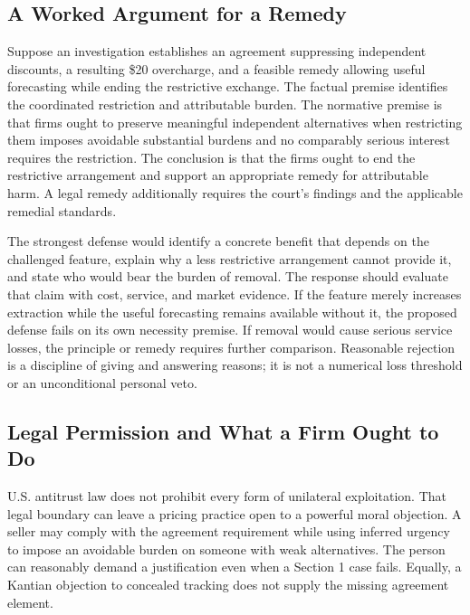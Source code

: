 \hypertarget{M09-a-worked-argument-for-a-remedy}{%
\subsection{A Worked Argument for a
Remedy}\label{M09-a-worked-argument-for-a-remedy}}

\noindent \noindent Suppose an investigation establishes an agreement suppressing
independent discounts, a resulting \$20 overcharge, and a feasible
remedy allowing useful forecasting while ending the restrictive
exchange. The factual premise identifies the coordinated restriction and
attributable burden. The normative premise is that firms ought to
preserve meaningful independent alternatives when restricting them
imposes avoidable substantial burdens and no comparably serious interest
requires the restriction. The conclusion is that the firms ought to end
the restrictive arrangement and support an appropriate remedy for
attributable harm. A legal remedy additionally requires the court's
findings and the applicable remedial standards.

The strongest defense would identify a concrete benefit that depends on
the challenged feature, explain why a less restrictive arrangement
cannot provide it, and state who would bear the burden of removal. The
response should evaluate that claim with cost, service, and market
evidence. If the feature merely increases extraction while the useful
forecasting remains available without it, the proposed defense fails on
its own necessity premise. If removal would cause serious service
losses, the principle or remedy requires further comparison. Reasonable
rejection is a discipline of giving and answering reasons; it is not a
numerical loss threshold or an unconditional personal veto.

\hypertarget{M09-legal-permission-and-what-a-firm-ought-to-do}{%
\subsection{Legal Permission and What a Firm Ought to
Do}\label{M09-legal-permission-and-what-a-firm-ought-to-do}}

\noindent \noindent U.S. antitrust law does not prohibit every form of unilateral
exploitation. That legal boundary can leave a pricing practice open to a
powerful moral objection. A seller may comply with the agreement
requirement while using inferred urgency to impose an avoidable burden
on someone with weak alternatives. The person can reasonably demand a
justification even when a Section 1 case fails. Equally, a Kantian
objection to concealed tracking does not supply the missing agreement
element.


